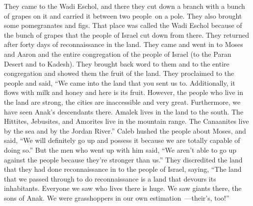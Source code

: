 \begin{inparaenum}
     They came to the Wadi Eschol, and there they cut down a branch with a bunch of grapes on it and carried it between two people\understood\ on a pole. They also brought some pomegranates and figs.%
     That place was called the Wadi Eschol because of the bunch of grapes that the people of Israel cut down from there.%
     They returned after forty days of reconnaissance in the land.%
     They came and went in to Moses and Aaron and the entire congregation of the people of Israel (to the Paran Desert and to Kadesh). They brought back word to them and to the entire congregation and showed them the fruit of the land.%
     They proclaimed to the people and said, ``We came into the land that you sent us to. Additionally, it flows with milk and honey and here is its fruit.%
     However, the people who live in the land are strong, the cities are inaccessible and very great. Furthermore, we have seen Anak's descendants there.%
     Amalek lives in the land to the south. The Hittites, Jebusites, and Amorites live in the mountain range. The Canaanites live by the sea and by the Jordan River.''\understood%
     Caleb hushed the people about Moses, and said, ``We will definitely go up and possess it because we are totally capable of doing so.''%
     But the men who went up with him said, ``We aren't able to go up against the people because they're stronger than us.''%
     They discredited the land that they had done reconnaissance in to the people of Israel, saying, ``The land that we passed through to do reconnaissance is a land that devours its inhabitants. Everyone we saw who lives there is huge.%
     We saw giants there, the sons of Anak. We were grasshoppers in our own estimation~---their's, too!''%
\end{inparaenum}
